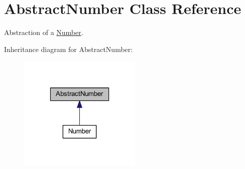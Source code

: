 \hypertarget{class_abstract_number}{\section{Abstract\-Number Class Reference}
\label{class_abstract_number}
}


Abstraction of a \hyperlink{class_number}{Number}.  




Inheritance diagram for Abstract\-Number\-:\nopagebreak
\begin{figure}[H]
\begin{center}
\leavevmode
\includegraphics[width=166pt]{class_abstract_number__inherit__graph}
\end{center}
\end{figure}
